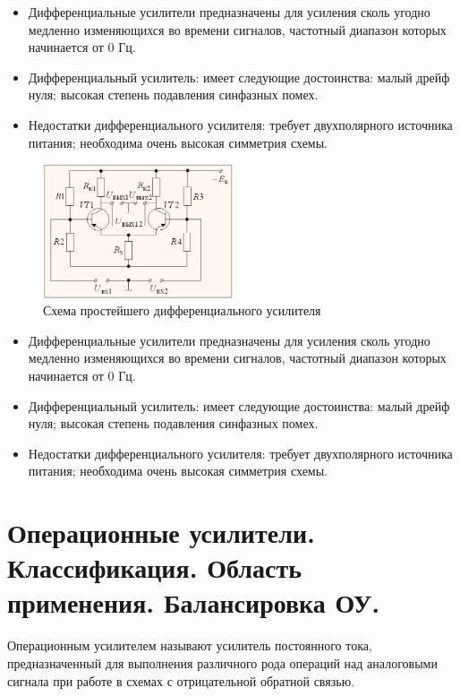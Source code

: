 \documentclass[unicode, 12pt, a4paper, oneside]{article}
\begin{document}
\begin{itemize}
\item Дифференциальные усилители предназначены для усиления сколь угодно медленно изменяющихся во времени сигналов, частотный диапазон которых начинается от 0 Гц.
\item Дифференциальный усилитель: имеет следующие достоинства: малый дрейф нуля; высокая степень подавления синфазных помех.
\item Недостатки дифференциального усилителя: требует двухполярного источника питания; необходима очень высокая симметрия схемы.
\end{itemize}
\begin{figure}[H]
\centering
\includegraphics[width=0.5\textwidth]{7_diff_amp.png}
\caption{Схема простейшего дифференциального усилителя}
\label{fig:7_diff_amp}
\end{figure}
\begin{itemize}
\item Дифференциальные усилители предназначены для усиления сколь угодно медленно изменяющихся во времени сигналов, частотный диапазон которых начинается от 0 Гц.
\item Дифференциальный усилитель: имеет следующие достоинства: малый дрейф нуля; высокая степень подавления синфазных помех.
\item Недостатки дифференциального усилителя: требует двухполярного источника питания; необходима очень высокая симметрия схемы.
\end{itemize}


\section{Операционные усилители. Классификация. Область применения. Балансировка ОУ.}

Операционным усилителем называют усилитель постоянного тока, предназначенный для выполнения различного рода операций над аналоговыми сигнала при работе в схемах с отрицательной обратной связью.
\end{document}
